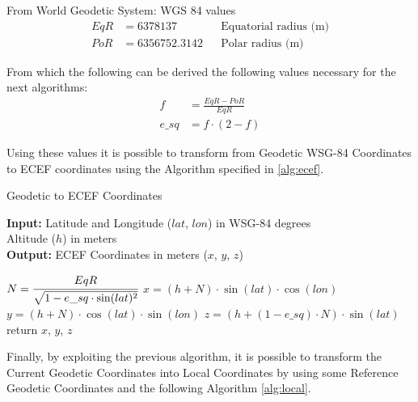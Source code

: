 {%

From World Geodetic System: WGS 84 values
\begin{align}
    EqR &= 6378137 && \text{Equatorial radius (m)} \\
    PoR &= 6356752.3142 && \text{Polar radius (m)}
\end{align}

From which the following can be derived the following values necessary for the next algorithms:
\begin{align}
    f &= \frac{EqR - PoR}{EqR} \\
    e\_sq &= f \cdot (2-f)
\end{align}

Using these values it is possible to transform from Geodetic WSG-84 Coordinates to ECEF coordinates using the  Algorithm specified in \ref{alg:ecef}.


\begin{algorithm}[H]
\caption{Geodetic to ECEF Coordinates }
\label{alg:ecefApp}
  \hspace*{\algorithmicindent} \textbf{Input:} Latitude and Longitude ($lat$, $lon$) in WSG-84 degrees\\
  \hspace*{4em} Altitude ($h$) in meters\\
  \hspace*{\algorithmicindent} \textbf{Output:} ECEF Coordinates in meters ($x$, $y$, $z$)
  \begin{algorithmic}[1]
  \STATE $N = \cfrac{EqR}{\sqrt{1 - e\_sq \cdot \sin(lat)^2}}$
  \STATE $x = (h + N) \cdot \sin(lat) \cdot \cos(lon)$
  \STATE $y = (h + N) \cdot \cos(lat) \cdot \sin(lon)$
  \STATE $z = (h + (1 - e\_sq) \cdot N) \cdot \sin(lat)$
  \STATE return $x$, $y$, $z$
    \end{algorithmic}
\end{algorithm}

Finally, by exploiting the previous algorithm, it is possible to transform the Current Geodetic Coordinates into Local Coordinates by using some Reference Geodetic Coordinates and the following Algorithm \ref{alg:local}.

}
